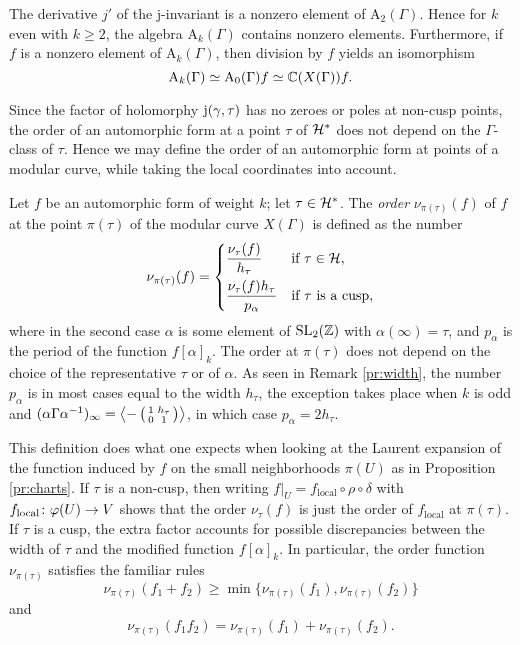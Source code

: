 \begin{rmk} \label{pr:nonzero-elt}
 The derivative $j'$ of the j-invariant is a nonzero element of $\mathrm{A}_2(\Gamma)$. Hence for $k$ even with $k\geq 2$, the algebra $\mathrm{A}_k(\Gamma)$ contains nonzero elements. Furthermore, if $f$ is a nonzero element of $\mathrm{A}_k(\Gamma)$, then division by $f$ yields an isomorphism \[\mathrm{A}_k(\Gamma)\simeq\mathrm{A}_0(\Gamma)f\simeq\mathbb{C}(X(\Gamma))f.\]
\end{rmk}

Since the factor of holomorphy $\mathrm{j}(\gamma,\tau)$ has no zeroes or poles at non-cusp points, the order of an automorphic form at a point $\tau$ of $\mathcal{H^*}$ does not depend on the $\Gamma$-class of $\tau$. Hence we may define the order of an automorphic form at points of a modular curve, while taking the local coordinates into account.
\begin{defi}
 Let $f$ be an automorphic form of weight $k$; let $\tau\in\mathcal{H^*}$. The \emph{order} $\nu_{\pi(\tau)}(f)$ of $f$ at the point $\pi(\tau)$ of the modular curve $X(\Gamma)$ is defined as the number
 \[\nu_{\pi(\tau)}(f)=\begin{dcases*}\frac{\nu_{\tau}(f)}{h_\tau} & if $\tau\in\mc{H}$, \\
                                  \frac{\nu_{\tau}(f)h_\tau}{p_\alpha} & if $\tau$ is a cusp,\end{dcases*}\]
 where in the second case $\alpha$ is some element of $\operatorname{SL}_2(\mathbb{Z})$ with $\alpha(\infty)=\tau$, and $p_\alpha$ is the period of the function $f[\alpha]_k$. The order at $\pi(\tau)$ does not depend on the choice of the representative $\tau$ or of $\alpha$. As seen in Remark \ref{pr:width}, the number $p_\alpha$ is in most cases equal to the width $h_\tau$, the exception takes place when $k$ is odd and $(\alpha\Gamma\alpha^{-1})_\infty=\left\langle -\left(\begin{smallmatrix}1&h_\tau \\ 0&1\end{smallmatrix}\right) \right\rangle$, in which case $p_\alpha=2h_\tau$.
\end{defi}

\begin{rmk}
 This definition does what one expects when looking at the Laurent expansion of the function induced by $f$ on the small neighborhoods $\pi(U)$ as in Proposition \ref{pr:charts}. If $\tau$ is a non-cusp, then writing $f|_U=f_{\text{local}}\circ\rho\circ\delta$ with $f_{\text{local}}\colon\varphi(U)\to V$ shows that the order $\nu_\tau(f)$ is just the order of $f_{\text{local}}$ at $\pi(\tau)$. If $\tau$ is a cusp, the extra factor accounts for possible discrepancies between the width of $\tau$ and the modified function $f[\alpha]_k$. In particular, the order function $\nu_{\pi(\tau)}$ satisfies the familiar rules \[\nu_{\pi(\tau)}(f_1+f_2)\geq\min\{\nu_{\pi(\tau)}(f_1),\nu_{\pi(\tau)}(f_2)\}\] and \[\nu_{\pi(\tau)}(f_1f_2)=\nu_{\pi(\tau)}(f_1) + \nu_{\pi(\tau)}(f_2).\]
\end{rmk}


